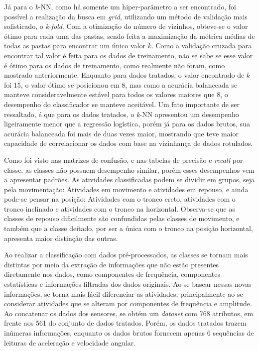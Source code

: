 
Já para o \textit{k}-NN, como há somente um hiper-parâmetro a ser encontrado, foi possível a realização da busca em \textit{grid}, utilizando um método de validação mais sofisticado, o \textit{k-fold}. Com a otimização do número de vizinhos, obteve-se o valor ótimo para cada uma das pastas, sendo feita a maximização da métrica médias de todas as pastas para encontrar um único valor $k$. Como a validação cruzada para encontrar tal valor é feita para os dados de treinamento, não se sabe se esse valor é ótimo para os dados de treinamento, como realmente não foram, como mostrado anteriormente. Enquanto para dados tratados, o valor encontrado de $k$ foi 15, o valor ótimo se posicionou em 8, mas como a acurácia balanceada se manteve consideravelmente estável para todos os valores maiores que 8, o desempenho do classificador se manteve aceitável. Um fato importante de ser ressaltado, é que para os dados tratados, o \textit{k}-NN apresentou um desempenho ligeiramente menor que a regressão logística, porém já para os dados brutos, sua acurácia balanceada foi mais de duas vezes maior, mostrando que teve maior capacidade de correlacionar os dados com base na vizinhança de dados rotulados.



Como foi visto nas matrizes de confusão, e nas tabelas de precisão e \textit{recall} por classe, as classes não possuem desempenho similar, porém esses desempenhos vem a apresentar padrões. As atividades classificadas podem se dividir em grupos, seja pela movimentação: Atividades em movimento e atividades em repouso, e ainda pode-se pensar na posição: Atividades com o tronco ereto, atividades com o tronco inclinado e atividades com o tronco na horizontal. Observa-se que as classes de repouso dificilmente são confundidas pelas classes de movimento, e também que a classe deitado, por ser a única com o tronco na posição horizontal, apresenta maior distinção das outras.


Ao realizar a classificação com dados pré-processados, as classes se tornam mais distintas por meio da extração de informações que não estão presentes diretamente nos dados, como componentes de frequência, componentes estatísticas e informações filtradas dos dados originais. Ao se basear nessas novas informações, se torna mais fácil diferenciar as atividades, principalmente ao se considerar atividades que se alteram por componentes de frequência e amplitude. Ao concatenar os dados dos sensores, se obtém um \textit{dataset} com 768 atributos, em frente aos 561 do conjunto de dados tratados. Porém, os dados tratados trazem inúmeras informações, enquanto os dados brutos fornecem apenas 6 sequências de leituras de aceleração e velocidade angular.

